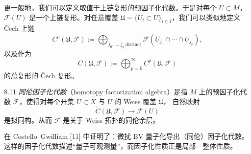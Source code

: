 更一般地，我们可以定义取值于上链复形的预因子化代数。于是对每个 $U\subset M$，
$\mathcal{F}(U)$ 是一个上链复形。对任意覆盖
$\mathfrak{U}=\{U_i\subset U\}_{i\in I}$，我们可以类似地定义 \v{C}ech 上链
\[
  C^{p}(\mathfrak{U},\mathcal{F})
  :=\bigoplus_{j_0,\dots,j_p\ \mathrm{distinct}}
  \mathcal{F}(U_{j_0}\cap\cdots\cap U_{j_p}),
\]
以及作为
\[
  \check{C}(\mathfrak{U},\mathcal{F})
  :=\bigoplus_{p=0}^{\infty}C^{p}(\mathfrak{U},\mathcal{F})
\]
的总复形的 \v{C}ech 复形。

\begin{wdefn}{8.11}
  \emph{同伦因子化代数}（homotopy factorization algebra）是指 $M$ 上的预因子化代数
  $\mathcal{F}$，使得对每个开集 $U\subset X$ 与 $U$ 的 Weiss 覆盖 $\mathfrak{U}$，
  自然映射
  \[
    \check{C}(\mathfrak{U},\mathcal{F})\longrightarrow\mathcal{F}(U)
  \]
  是拟同构。从而 $\mathcal{F}$ 是关于 Weiss 拓扑的同伦余层。
\end{wdefn}


在 Costello--Gwilliam \textup{[11]} 中证明了：微扰 BV 量子化导出（同伦）因子化代数。
这样的因子化代数描述“量子可观测量”，而因子化性质正是局部—整体性质。


